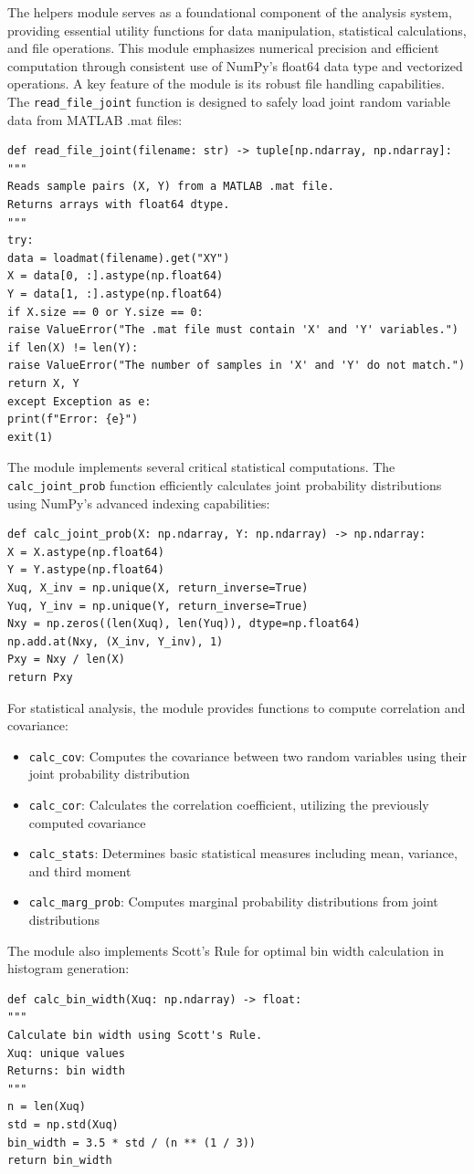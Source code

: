 \documentclass{article}
\begin{document}
The helpers module serves as a foundational component of the analysis system, providing essential utility functions for data manipulation, statistical calculations, and file operations. This module emphasizes numerical precision and efficient computation through consistent use of NumPy's float64 data type and vectorized operations.
A key feature of the module is its robust file handling capabilities. The \texttt{read\_file\_joint} function is designed to safely load joint random variable data from MATLAB .mat files:
\begin{verbatim}
def read_file_joint(filename: str) -> tuple[np.ndarray, np.ndarray]:
"""
Reads sample pairs (X, Y) from a MATLAB .mat file.
Returns arrays with float64 dtype.
"""
try:
data = loadmat(filename).get("XY")
X = data[0, :].astype(np.float64)
Y = data[1, :].astype(np.float64)
if X.size == 0 or Y.size == 0:
raise ValueError("The .mat file must contain 'X' and 'Y' variables.")
if len(X) != len(Y):
raise ValueError("The number of samples in 'X' and 'Y' do not match.")
return X, Y
except Exception as e:
print(f"Error: {e}")
exit(1)
\end{verbatim}
The module implements several critical statistical computations. The \texttt{calc\_joint\_prob} function efficiently calculates joint probability distributions using NumPy's advanced indexing capabilities:
\begin{verbatim}
def calc_joint_prob(X: np.ndarray, Y: np.ndarray) -> np.ndarray:
X = X.astype(np.float64)
Y = Y.astype(np.float64)
Xuq, X_inv = np.unique(X, return_inverse=True)
Yuq, Y_inv = np.unique(Y, return_inverse=True)
Nxy = np.zeros((len(Xuq), len(Yuq)), dtype=np.float64)
np.add.at(Nxy, (X_inv, Y_inv), 1)
Pxy = Nxy / len(X)
return Pxy
\end{verbatim}
For statistical analysis, the module provides functions to compute correlation and covariance:
\begin{itemize}
\item \texttt{calc\_cov}: Computes the covariance between two random variables using their joint probability distribution
\item \texttt{calc\_cor}: Calculates the correlation coefficient, utilizing the previously computed covariance
\item \texttt{calc\_stats}: Determines basic statistical measures including mean, variance, and third moment
\item \texttt{calc\_marg\_prob}: Computes marginal probability distributions from joint distributions
\end{itemize}
The module also implements Scott's Rule for optimal bin width calculation in histogram generation:
\begin{verbatim}
def calc_bin_width(Xuq: np.ndarray) -> float:
"""
Calculate bin width using Scott's Rule.
Xuq: unique values
Returns: bin width
"""
n = len(Xuq)
std = np.std(Xuq)
bin_width = 3.5 * std / (n ** (1 / 3))
return bin_width
\end{verbatim}
\end{document}
